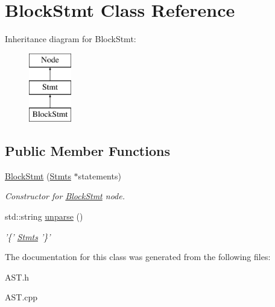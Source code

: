 \hypertarget{classBlockStmt}{\section{Block\-Stmt Class Reference}
\label{classBlockStmt}
}
Inheritance diagram for Block\-Stmt\-:\begin{figure}[H]
\begin{center}
\leavevmode
\includegraphics[height=3.000000cm]{classBlockStmt}
\end{center}
\end{figure}
\subsection*{Public Member Functions}
\begin{DoxyCompactItemize}
\item 
\hypertarget{classBlockStmt_a408f4f91dbd460a3908fe2d62643e05a}{\hyperlink{classBlockStmt_a408f4f91dbd460a3908fe2d62643e05a}{Block\-Stmt} (\hyperlink{classStmts}{Stmts} $\ast$statements)}\label{classBlockStmt_a408f4f91dbd460a3908fe2d62643e05a}

\begin{DoxyCompactList}\small\item\em Constructor for \hyperlink{classBlockStmt}{Block\-Stmt} node. \end{DoxyCompactList}\item 
\hypertarget{classBlockStmt_ad8eecdba3683f767d08fefc7804c849d}{std\-::string \hyperlink{classBlockStmt_ad8eecdba3683f767d08fefc7804c849d}{unparse} ()}\label{classBlockStmt_ad8eecdba3683f767d08fefc7804c849d}

\begin{DoxyCompactList}\small\item\em '\{' \hyperlink{classStmts}{Stmts} '\}' \end{DoxyCompactList}\end{DoxyCompactItemize}


The documentation for this class was generated from the following files\-:\begin{DoxyCompactItemize}
\item 
A\-S\-T.\-h\item 
A\-S\-T.\-cpp\end{DoxyCompactItemize}
